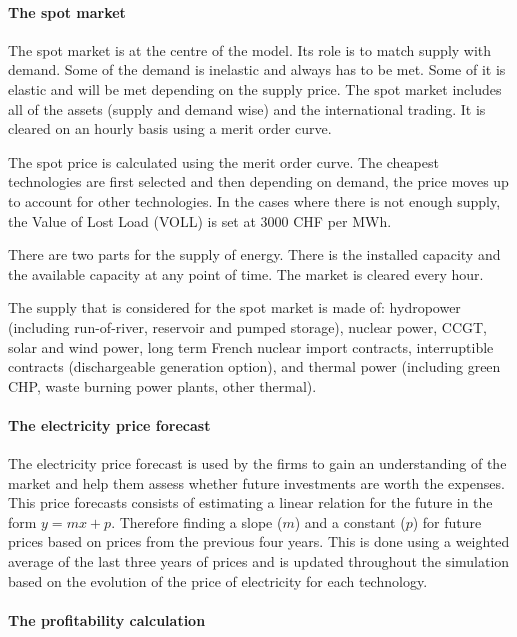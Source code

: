 \paragraph{The spot market}

The spot market is at the centre of the model. Its role is to match supply with demand. Some of the demand is inelastic and always has to be met. Some of it is elastic and will be met depending on the supply price. The spot market includes all of the assets (supply and demand wise) and the international trading. It is cleared on an hourly basis using a merit order curve. 

The spot price is calculated using the merit order curve. The cheapest technologies are first selected and then depending on demand, the price moves up to account for other technologies. In the cases where there is not enough supply, the Value of Lost Load (VOLL) is set at 3000 CHF per MWh.

There are two parts for the supply of energy. There is the installed capacity and the available capacity at any point of time. The market is cleared every hour.

The supply that is considered for the spot market is made of: hydropower (including run-of-river, reservoir and pumped storage), nuclear power, CCGT, solar and wind power, long term French nuclear import contracts, interruptible contracts (dischargeable generation option), and thermal power (including green CHP, waste burning power plants, other thermal).

\paragraph{The electricity price forecast}

The electricity price forecast is used by the firms to gain an understanding of the market and help them assess whether future investments are worth the expenses. This price forecasts consists of estimating a linear relation for the future in the form $y = mx + p$. Therefore finding a slope ($m$) and a constant ($p$) for future prices based on prices from the previous four years. This is done using a weighted average of the last three years of prices and is updated throughout the simulation based on the evolution of the price of electricity for each technology.


\paragraph{The profitability calculation}

